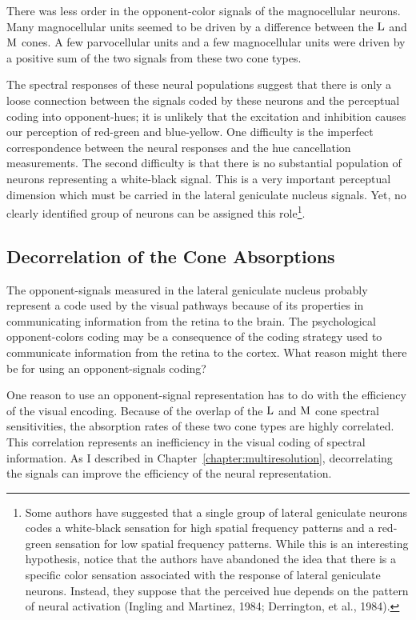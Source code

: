 There was less order in the opponent-color signals of the
magnocellular neurons.  Many magnocellular units seemed to be driven
by a difference between the $\mbox{L}$ and $\mbox{M}$ cones.  A few
parvocellular units and a few magnocellular units were driven by a
positive sum of the two signals from these two cone types.

The spectral responses of these neural populations suggest that there
is only a loose connection between the signals coded by these neurons and the
perceptual coding into opponent-hues; it is unlikely that the
excitation and inhibition causes our perception of red-green and
blue-yellow.  One difficulty is the imperfect correspondence between
the neural responses and the hue cancellation measurements.  The
second difficulty is that there is no substantial population of
neurons representing a white-black signal.  This is a very important
perceptual dimension which must be carried in the lateral geniculate
nucleus signals.  Yet, no clearly identified group of neurons can be
assigned this role\footnote{Some authors have suggested that a single
group of lateral geniculate neurons codes a white-black sensation for
high spatial frequency patterns and a red-green sensation for low
spatial frequency patterns.  While this is an interesting hypothesis,
notice that the authors have abandoned the idea that there is a
specific color sensation associated with the response of lateral
geniculate neurons.  Instead, they suppose that the perceived hue
depends on the pattern of neural activation (Ingling and Martinez,
1984; Derrington, et al., 1984).}.

\subsection*{Decorrelation of the Cone Absorptions} The
opponent-signals measured in the lateral geniculate nucleus probably
represent a code used by the visual pathways because of its
properties in communicating information from the retina to the brain.
The psychological opponent-colors coding may be a consequence of the
coding strategy used to communicate information from the retina to
the cortex.  What reason might there be for using an opponent-signals
coding?

One reason to use an opponent-signal representation has to do with the
efficiency
of the visual encoding.  Because of the overlap of the $\mbox{L}$ and
$\mbox{M}$ cone spectral sensitivities, the absorption rates of these
two cone types are highly correlated.  This correlation represents an
inefficiency in the visual coding of spectral information.  As I
described in Chapter~\ref{chapter:multiresolution}, decorrelating the
signals can improve the efficiency of the neural representation.

